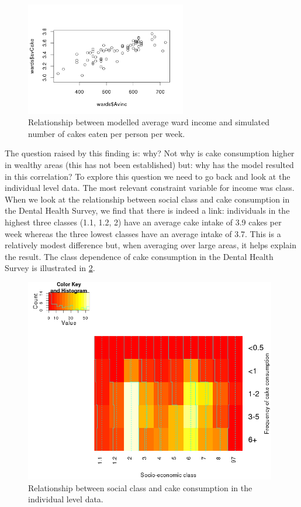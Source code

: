 \documentclass[a4paper, 11pt, twoside]{article}
\begin{document}
\begin{figure}
\centering
 \includegraphics[width=7cm]{incomeCake}
\caption{Relationship between modelled average ward income and
 simulated number of cakes eaten per person per week.}
\label{incomeCake}
\end{figure}

The question raised by this finding is: why? 
Not why is cake consumption higher in wealthy areas (this has not
been established) but: why has the model resulted in this correlation?
To explore this question we need to go back and look at the individual
level data. The most relevant constraint variable for income was class.
When we look at the relationship between social class and cake consumption
in the Dental Health Survey, we find that there is indeed a link:
individuals in the highest three classes (1.1, 1.2, 2) have an average
cake intake of 3.9 cakes per week whereas the three lowest classes have
an average intake of 3.7. This is a relatively modest difference but,
when averaging over large areas, it helps explain the result.
The class dependence of cake consumption in the Dental Health Survey is
illustrated in \cref{hm}.

\begin{figure}
\centering
 \includegraphics[width=11cm]{hm}
\caption{Relationship between social class and cake consumption in the
individual level data.}
\label{hm}
\end{figure}
\end{document}
